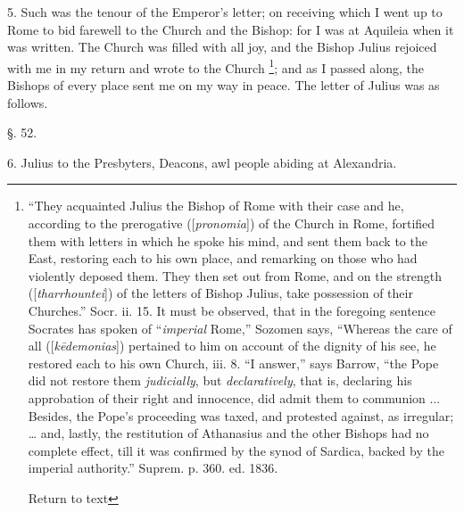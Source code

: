 5. Such was the tenour of the Emperor's letter;
on receiving which I went up to Rome to bid farewell to the Church and
the Bishop: for I was at Aquileia when it was written. The Church was
filled with all joy, and the Bishop Julius rejoiced with me in my
return and wrote to the Church \footnote{``They acquainted Julius the Bishop of Rome
with their case and he, according to the prerogative ([\emph{pronomia}])
of the Church in Rome, fortified them with letters in which he spoke
his mind, and sent them back to the East, restoring each to his own
place, and remarking on those who had violently deposed them. They
then set out from Rome, and on the strength ([\emph{tharrhountei}]) of
the letters of Bishop Julius, take possession of their Churches.'' Socr.
ii. 15. It must be observed, that in the foregoing sentence Socrates
has spoken of ``\emph{imperial} Rome,'' Sozomen says, ``Whereas the care
of all ([\emph{k\={e}demonias}]) pertained to him on account of the
dignity of his see, he restored each to his own Church, iii. 8. ``I
answer,'' says Barrow, ``the Pope did not restore them \emph{judicially},
but \emph{declaratively}, that is, declaring his approbation of their
right and innocence, did admit them to communion ... Besides, the Pope's
proceeding was taxed, and protested against, as irregular; … and,
lastly, the restitution of Athanasius and the other Bishops had no
complete effect, till it was confirmed by the synod of Sardica, backed
by the imperial authority.'' Suprem. p. 360. ed. 1836.

Return to text};
and as I passed along, the Bishops of every place sent me on my way in
peace. The letter of Julius was as follows.

§. 52.

6. Julius to the Presbyters, Deacons, awl people
abiding at Alexandria.

